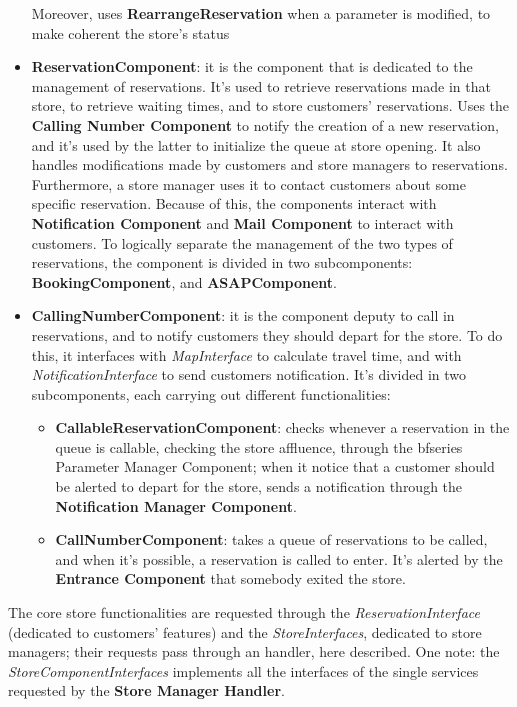 \documentclass{article}
\begin{document}
\begin{itemize}
				Moreover, uses {\bfseries RearrangeReservation} when a parameter is modified, to make coherent the store’s status
				
				\item {\bfseries ReservationComponent}: it is the component that is dedicated to the management of reservations. It’s used to retrieve reservations made in that store, to retrieve waiting times, and to store customers’ reservations. Uses the {\bfseries Calling Number Component} to notify the creation of a new reservation, and it’s used by the latter to initialize the queue at store opening. It also handles modifications made by customers and store managers to reservations. Furthermore, a store manager uses it to contact customers about some specific reservation. Because of this, the components interact with {\bfseries Notification Component} and {\bfseries Mail Component} to interact with customers. 
				To logically separate the management of the two types of reservations, the component is divided in two subcomponents: {\bfseries BookingComponent}, and {\bfseries ASAPComponent}.
				
				\item {\bfseries CallingNumberComponent}: it is the component deputy to call in reservations, and to notify customers they should depart for the store. To do this, it interfaces with \emph{MapInterface} to calculate travel time, and with \emph{NotificationInterface} to send customers notification. It’s divided in two subcomponents, each carrying out different functionalities:
				
				\begin{itemize}
					\item {\bfseries CallableReservationComponent}: checks whenever a reservation in the queue is callable, checking the store affluence, through the {bfseries Parameter Manager Component}; when it notice that a customer should be alerted to depart for the store, sends a notification through the {\bfseries Notification Manager Component}.
					
					\item {\bfseries CallNumberComponent}: takes a queue of reservations to be called, and when it’s possible, a reservation is called to enter. It’s alerted by the {\bfseries Entrance Component} that somebody exited the store.
				\end{itemize}
			\end{itemize}
		
			The core store functionalities are requested through the \emph{ReservationInterface} (dedicated to customers’ features) and the \emph{StoreInterfaces}, dedicated to store managers; their requests pass through an handler, here described. One note: the \emph{StoreComponentInterfaces} implements all the interfaces of the single services requested by the {\bfseries Store Manager Handler}.
			
\end{document}

